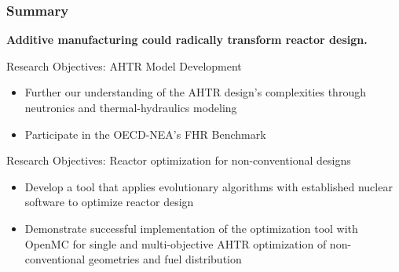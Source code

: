 \begin{frame}
    \frametitle{Summary}
    \textbf{Additive manufacturing could radically transform reactor design.}
    \begin{block}{Research Objectives: AHTR Model Development}
        \begin{itemize}
            \item Further our understanding of the AHTR design's complexities 
            through neutronics and thermal-hydraulics modeling
            \item Participate in the OECD-NEA's FHR Benchmark
        \end{itemize}
    \end{block}

    \begin{block}{Research Objectives: Reactor optimization for non-conventional designs}
        \begin{itemize}
            \item Develop a tool that applies evolutionary algorithms with established 
            nuclear software to optimize reactor design
            \item Demonstrate successful implementation of the optimization tool 
            with OpenMC for single and multi-objective AHTR optimization of 
            non-conventional geometries and fuel distribution
        \end{itemize}
    \end{block}
\end{frame}